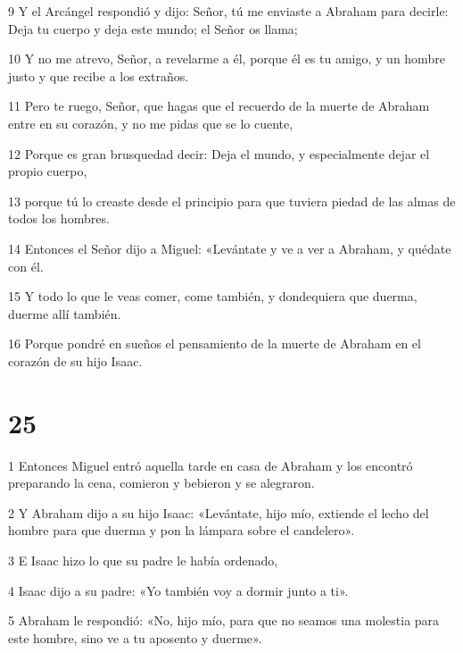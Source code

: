 \par 9 Y el Arcángel respondió y dijo: Señor, tú me enviaste a Abraham para decirle: Deja tu cuerpo y deja este mundo; el Señor os llama;

\par 10 Y no me atrevo, Señor, a revelarme a él, porque él es tu amigo, y un hombre justo y que recibe a los extraños.

\par 11 Pero te ruego, Señor, que hagas que el recuerdo de la muerte de Abraham entre en su corazón, y no me pidas que se lo cuente,

\par 12 Porque es gran brusquedad decir: Deja el mundo, y especialmente dejar el propio cuerpo,

\par 13 porque tú lo creaste desde el principio para que tuviera piedad de las almas de todos los hombres.

\par 14 Entonces el Señor dijo a Miguel: «Levántate y ve a ver a Abraham, y quédate con él.

\par 15 Y todo lo que le veas comer, come también, y dondequiera que duerma, duerme allí también.

\par 16 Porque pondré en sueños el pensamiento de la muerte de Abraham en el corazón de su hijo Isaac.

\chapter{25}

\par 1 Entonces Miguel entró aquella tarde en casa de Abraham y los encontró preparando la cena, comieron y bebieron y se alegraron.

\par 2 Y Abraham dijo a su hijo Isaac: «Levántate, hijo mío, extiende el lecho del hombre para que duerma y pon la lámpara sobre el candelero».

\par 3 E Isaac hizo lo que su padre le había ordenado,

\par 4 Isaac dijo a su padre: «Yo también voy a dormir junto a ti».

\par 5 Abraham le respondió: «No, hijo mío, para que no seamos una molestia para este hombre, sino ve a tu aposento y duerme».

